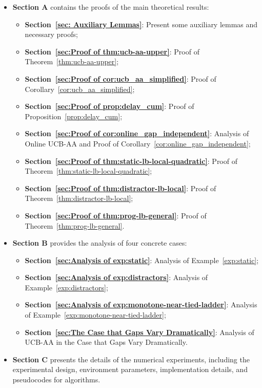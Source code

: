 \documentclass[
  12pt]{article}
\begin{document}
\begin{itemize}
    \item \textbf{Section A} contains the proofs of the main theoretical results:
    \begin{itemize}
        \item \textbf{Section~\ref{sec: Auxiliary Lemmas}}: Present some auxiliary lemmas and necessary proofs;
        \item \textbf{Section~\ref{sec:Proof of thm:ucb-aa-upper}}: Proof of Theorem~\ref{thm:ucb-aa-upper};
        \item \textbf{Section~\ref{sec:Proof of cor:ucb_aa_simplified}}: Proof of Corollary~\ref{cor:ucb_aa_simplified};
        \item \textbf{Section~\ref{sec:Proof of prop:delay_cum}}: Proof of Proposition~\ref{prop:delay_cum};
        \item \textbf{Section~\ref{sec:Proof of cor:online_gap_independent}}: Analysis of Online UCB-AA and Proof of Corollary~\ref{cor:online_gap_independent};
        \item \textbf{Section~\ref{sec:Proof of thm:static-lb-local-quadratic}}: Proof of 
        Theorem~\ref{thm:static-lb-local-quadratic};
        \item  \textbf{Section~\ref{sec:Proof of thm:distractor-lb-local}}: Proof of Theorem~\ref{thm:distractor-lb-local};
        \item  \textbf{Section~\ref{sec:Proof of thm:prog-lb-general}}: Proof of Theorem~\ref{thm:prog-lb-general}.
    \end{itemize}
    
    \item \textbf{Section B} provides the analysis of four concrete cases:
    \begin{itemize}
        \item \textbf{Section~\ref{sec:Analysis of exp:static}}: Analysis of Example~\ref{exp:static};
        \item \textbf{Section~\ref{sec:Analysis of exp:distractors}}: Analysis of Example~\ref{exp:distractors};
        \item \textbf{Section~\ref{sec:Analysis of exp:monotone-near-tied-ladder}}: Analysis of Example~\ref{exp:monotone-near-tied-ladder};
        \item \textbf{Section~\ref{sec:The Case that Gaps Vary Dramatically}}: Analysis of UCB-AA in the Case that Gaps Vary Dramatically.
    \end{itemize}
    
    \item \textbf{Section C} presents the details of the numerical experiments, including the experimental design, environment parameters, implementation details, and pseudocodes for algorithms.
\end{itemize}
\end{document}
